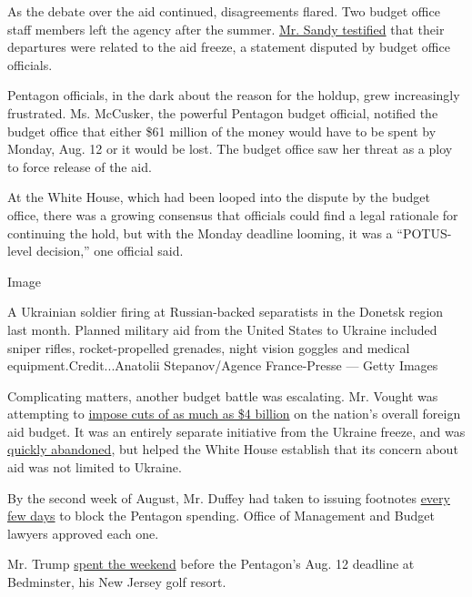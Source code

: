 As the debate over the aid continued, disagreements flared. Two budget
office staff members left the agency after the summer.
\href{https://www.documentcloud.org/documents/6592845-2019-11-Mark-Sandy-Final-Redacted.html\#document/p149/a541492}{Mr.
Sandy testified} that their departures were related to the aid freeze, a
statement disputed by budget office officials.

Pentagon officials, in the dark about the reason for the holdup, grew
increasingly frustrated. Ms. McCusker, the powerful Pentagon budget
official, notified the budget office that either \$61 million of the
money would have to be spent by Monday, Aug. 12 or it would be lost. The
budget office saw her threat as a ploy to force release of the aid.

At the White House, which had been looped into the dispute by the budget
office, there was a growing consensus that officials could find a legal
rationale for continuing the hold, but with the Monday deadline looming,
it was a ``POTUS-level decision,'' one official said.

Image

A Ukrainian soldier firing at Russian-backed separatists in the Donetsk
region last month. Planned military aid from the United States to
Ukraine included sniper rifles, rocket-propelled grenades, night vision
goggles and medical equipment.Credit...Anatolii Stepanov/Agence
France-Presse --- Getty Images

Complicating matters, another budget battle was escalating. Mr. Vought
was attempting to
\href{https://www.nytimes.com/2019/08/07/us/politics/foreign-aid-freeze-congress.html}{impose
cuts of as much as \$4 billion} on the nation's overall foreign aid
budget. It was an entirely separate initiative from the Ukraine freeze,
and was
\href{https://www.nytimes.com/2019/08/22/us/politics/trump-foreign-aid.html}{quickly
abandoned}, but helped the White House establish that its concern about
aid was not limited to Ukraine.

By the second week of August, Mr. Duffey had taken to issuing footnotes
\href{https://www.documentcloud.org/documents/6592845-2019-11-Mark-Sandy-Final-Redacted.html\#document/p127/a541468}{every
few days} to block the Pentagon spending. Office of Management and
Budget lawyers approved each one.

Mr. Trump \href{https://trumpgolfcount.com/displayoutings}{spent the
weekend} before the Pentagon's Aug. 12 deadline at Bedminster, his New
Jersey golf resort.

